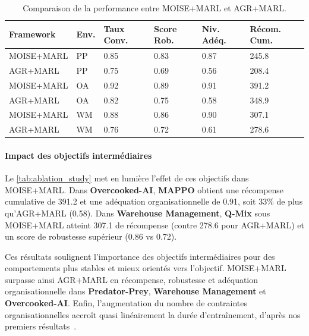 \documentclass[francais,ROIA,Unicode,manuscript]{cedram}
\begin{document}
\begin{table}[h!]
    \centering
    \caption{Comparaison de la performance entre MOISE+MARL et AGR+MARL.}
    \label{tab:ablation_study}
    \footnotesize
    \renewcommand{\arraystretch}{1.1}
    \begin{tabular}{p{2.1cm}p{0.5cm}p{0.7cm}p{0.7cm}p{0.6cm}p{0.9cm}}
        \hline
        \textbf{Framework} & \textbf{Env.} & \textbf{Taux Conv.} & \textbf{Score Rob.} & \textbf{Niv. Adéq.} & \textbf{Récom. Cum.} \\ \hline
        MOISE+MARL         & PP            & 0.85                & 0.83                & 0.87                & 245.8                \\
        AGR+MARL           & PP            & 0.75                & 0.69                & 0.56                & 208.4                \\
        MOISE+MARL         & OA            & 0.92                & 0.89                & 0.91                & 391.2                \\
        AGR+MARL           & OA            & 0.82                & 0.75                & 0.58                & 348.9                \\
        MOISE+MARL         & WM            & 0.88                & 0.86                & 0.90                & 307.1                \\
        AGR+MARL           & WM            & 0.76                & 0.72                & 0.61                & 278.6                \\ \hline
    \end{tabular}
\end{table}

\paragraph{Impact des objectifs intermédiaires}
Le \autoref{tab:ablation_study} met en lumière l’effet de ces objectifs dans MOISE+MARL. Dans \textbf{Overcooked-AI}, \textbf{MAPPO} obtient une récompense cumulative de 391.2 et une adéquation organisationnelle de 0.91, soit 33\% de plus qu’AGR+MARL (0.58). Dans \textbf{Warehouse Management}, \textbf{Q-Mix} sous MOISE+MARL atteint 307.1 de récompense (contre 278.6 pour AGR+MARL) et un score de robustesse supérieur (0.86 vs 0.72).

Ces résultats soulignent l’importance des objectifs intermédiaires pour des comportements plus stables et mieux orientés vers l’objectif. MOISE+MARL surpasse ainsi AGR+MARL en récompense, robustesse et adéquation organisationnelle dans \textbf{Predator-Prey}, \textbf{Warehouse Management} et \textbf{Overcooked-AI}.
%
Enfin, l’augmentation du nombre de contraintes organisationnelles accroît quasi linéairement la durée d’entraînement, d’après nos premiers résultats~\hyperref[fn:github]{\footnotemark[1]}.
\end{document}
